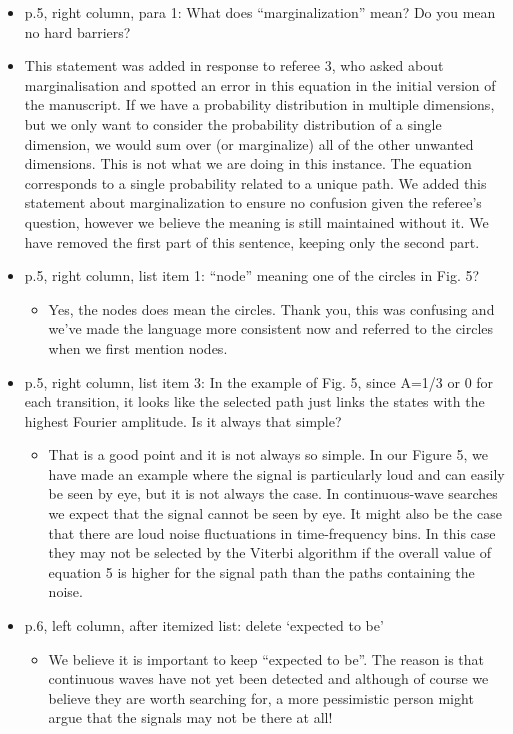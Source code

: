\documentclass[a4paper, 10pt]{letter}
\begin{document}
\begin{itemize}
\item p.5, right column, para 1: What does ``marginalization'' mean? Do you mean no hard barriers?
\item This statement was added in response to referee 3, who asked about marginalisation and spotted an error in this equation in the initial version of the manuscript. If we have a probability distribution in multiple dimensions, but we only want to consider the probability distribution of a single dimension, we would sum over (or marginalize) all of the other unwanted dimensions. This is not what we are doing in this instance. The equation corresponds to a single probability related to a unique path. We added this statement about marginalization to ensure no confusion given the referee's question, however we believe the meaning is still maintained without it. We have removed the first part of this sentence, keeping only the second part. 

\item p.5, right column, list item 1: ``node'' meaning one of the circles in Fig. 5? 
\begin{itemize}
\item Yes, the nodes does mean the circles. Thank you, this was confusing and we've made the language more consistent now and referred to the circles when we first mention nodes.
\end{itemize}

\item p.5, right column, list item 3: In the example of Fig. 5, since A=1/3 or 0 for each transition, it looks like the selected path just links the states with the highest Fourier amplitude. Is it always that simple?
\begin{itemize}
\item That is a good point and it is not always so simple. In our Figure 5, we have made an example where the signal is particularly loud and can easily be seen by eye, but it is not always the case. In continuous-wave searches we expect that the signal cannot be seen by eye. It might also be the case that there are loud noise fluctuations in time-frequency bins. In this case they may not be selected by the Viterbi algorithm if the overall value of equation 5 is higher for the signal path than the paths containing the noise. 
\end{itemize}

\item p.6, left column, after itemized list: delete `expected to be' 
\begin{itemize}
\item We believe it is important to keep ``expected to be''. The reason is that continuous waves have not yet been detected and although of course we believe they are worth searching for, a more pessimistic person might argue that the signals may not be there at all! 
\end{itemize}


\end{itemize}
\end{document}
